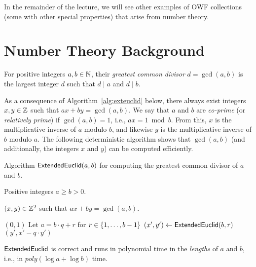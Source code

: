 \documentclass[11pt]{article}
\begin{document}
In the remainder of the lecture, we will see other examples of OWF
collections (some with other special properties) that arise from
number theory.

\section{Number Theory Background}
\label{sec:numb-theory-backgr}

\begin{definition}
   \label{def:gcd}
   For positive integers $a,b \in \mathbb{N}$, their \emph{greatest common
     divisor} $d = \gcd(a,b)$ is the largest integer $d$ such that $d
   \mid a$ and $d \mid b$.
\end{definition}

As a consequence of Algorithm~\ref{alg:exteuclid} below, there always
exist integers $x,y \in \mathbb{Z}$ such that $ax + by = \gcd(a,b)$.  We say
that $a$ and $b$ are \emph{co-prime} (or \emph{relatively prime}) if
$\gcd(a,b) = 1$, i.e., $ax = 1 \bmod b$.  From this, $x$ is the
multiplicative inverse of $a$ modulo $b$, and likewise $y$ is the
multiplicative inverse of $b$ modulo $a$.  The following deterministic
algorithm shows that $\gcd(a,b)$ (and additionally, the integers $x$
and $y$) can be computed efficiently.

\newcommand{\exteuclid}{\algo{ExtendedEuclid}}
\renewcommand{\algorithmicrequire}{\textbf{Input:}}
\renewcommand{\algorithmicensure}{\textbf{Output:}}

\begin{algorithm}
  \caption{Algorithm $\exteuclid(a,b)$ for computing the greatest
    common divisor of $a$ and $b$.}
  \label{alg:exteuclid}

  \begin{algorithmic}[1]
    \REQUIRE Positive integers $a \geq b > 0$.

    \ENSURE $(x,y) \in \mathbb{Z}^{2}$ such that $ax + by = \gcd(a,b)$.

    \RETURN $(0,1)$
    \ELSE
    \STATE Let $a = b \cdot q + r$ for $r \in \{1, \ldots, b-1\}$
    \STATE $(x',y') \gets \exteuclid(b,r)$
    \RETURN $(y', x' - q \cdot y')$
    \ENDIF
  \end{algorithmic}
\end{algorithm}

\begin{theorem}
  \label{thm:exteuclid}
  $\exteuclid$ is correct and runs in polynomial time in the
  \emph{lengths} of $a$ and $b$, i.e., in $poly(\log a + \log b)$
  time.
\end{theorem}
\end{document}
